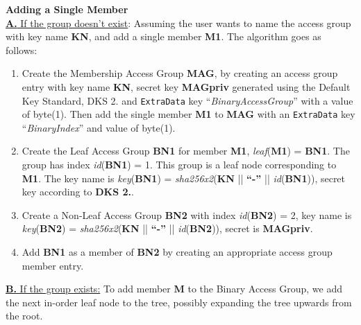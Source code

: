 \documentclass[oneside, 12pt]{article}
\begin{document}
\noindent\textbf{Adding a Single Member}\\
\noindent\underline{\textbf{A.} If the group doesn’t exist}: Assuming the user wants to name the access group with key name \textbf{KN}, and add a single member \textbf{M1}. The algorithm goes as follows:

\begin{enumerate}
  \item Create the Membership Access Group \textbf{MAG}, by creating an access group entry with key name \textbf{KN}, secret key \textbf{MAGpriv} generated using the Default Key Standard, DKS 2. and \texttt{ExtraData} key “\textit{BinaryAccessGroup}” with a value of byte(1). Then add the single member \textbf{M1} to \textbf{MAG} with an \texttt{ExtraData} key “\textit{BinaryIndex}” and value of byte(1).
  \item Create the Leaf Access Group \textbf{BN1} for member \textbf{M1}, \textit{leaf}(\textbf{M1}) = \textbf{BN1}. The group has index \textit{id}(\textbf{BN1}) = 1. This group is a leaf node corresponding to \textbf{M1}. The key name is \textit{key}(\textbf{BN1}) = \textit{sha256x2}(\textbf{KN} || \textbf{“-”} || \textit{id}(\textbf{BN1})), secret key according to \textbf{DKS 2.}.
  \item Create a Non-Leaf Access Group \textbf{BN2} with index \textit{id}(\textbf{BN2}) = 2, key name is \textit{key}(\textbf{BN2}) = \textit{sha256x2}(\textbf{KN} || \textbf{“-”} || \textit{id}(\textbf{BN2})), secret is \textbf{MAGpriv}.
  \item Add \textbf{BN1} as a member of \textbf{BN2} by creating an appropriate access group member entry.
\end{enumerate}

\noindent\underline{\textbf{B.} If the group exists:} To add member \textbf{M} to the Binary Access Group, we add the next in-order leaf node to the tree, possibly expanding the tree upwards from the root.
\end{document}
